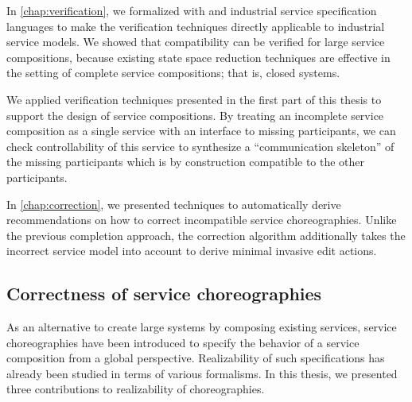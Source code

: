 \begin{niceitemize}
\item In \autoref{chap:verification}, we formalized with  and \bpelchor{} industrial service specification languages to make the verification techniques directly applicable to industrial service models. We showed that compatibility can be verified for large service compositions, because existing state space reduction techniques are effective in the setting of complete service compositions; that is, closed systems.

\item We applied verification techniques presented in the first part of this thesis to support the design of service compositions. By treating an incomplete service composition as a single service with an interface to missing participants, we can check controllability of this service to synthesize a ``communication skeleton'' of the missing participants which is by construction compatible to the other participants.

\item In \autoref{chap:correction}, we presented techniques to automatically derive recommendations on how to correct incompatible service choreographies. Unlike the previous completion approach, the correction algorithm additionally takes the incorrect service model into account to derive minimal invasive edit actions.
\end{niceitemize}




\subsection*{Correctness of service choreographies}

As an alternative to create large systems by composing existing services, service choreographies have been introduced to specify the behavior of a service composition from a global perspective. Realizability of such specifications has already been studied in terms of various formalisms. In this thesis, we presented three contributions to realizability of choreographies.

